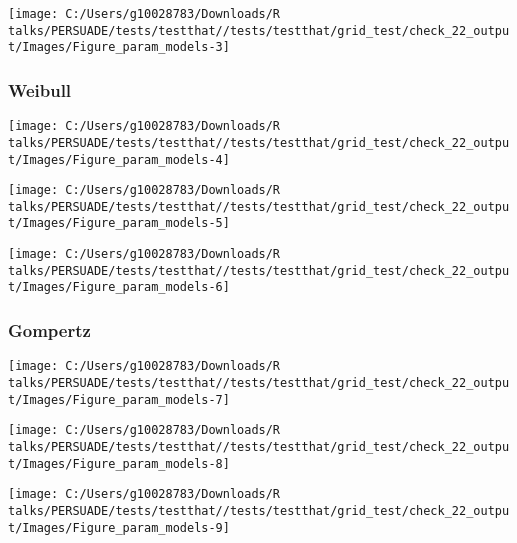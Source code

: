 \documentclass[
]{article}
\begin{document}
\begin{flushleft}\texttt{[image: C:/Users/g10028783/Downloads/R talks/PERSUADE/tests/testthat//tests/testthat/grid\_test/check\_22\_output/Images/Figure\_param\_models-3]} \end{flushleft}

\clearpage

\subsubsection{Weibull}\label{weibull}

\begin{flushleft}\texttt{[image: C:/Users/g10028783/Downloads/R talks/PERSUADE/tests/testthat//tests/testthat/grid\_test/check\_22\_output/Images/Figure\_param\_models-4]} \end{flushleft}

\begin{flushleft}\texttt{[image: C:/Users/g10028783/Downloads/R talks/PERSUADE/tests/testthat//tests/testthat/grid\_test/check\_22\_output/Images/Figure\_param\_models-5]} \end{flushleft}

\begin{flushleft}\texttt{[image: C:/Users/g10028783/Downloads/R talks/PERSUADE/tests/testthat//tests/testthat/grid\_test/check\_22\_output/Images/Figure\_param\_models-6]} \end{flushleft}

\clearpage

\subsubsection{Gompertz}\label{gompertz}

\begin{flushleft}\texttt{[image: C:/Users/g10028783/Downloads/R talks/PERSUADE/tests/testthat//tests/testthat/grid\_test/check\_22\_output/Images/Figure\_param\_models-7]} \end{flushleft}

\begin{flushleft}\texttt{[image: C:/Users/g10028783/Downloads/R talks/PERSUADE/tests/testthat//tests/testthat/grid\_test/check\_22\_output/Images/Figure\_param\_models-8]} \end{flushleft}

\begin{flushleft}\texttt{[image: C:/Users/g10028783/Downloads/R talks/PERSUADE/tests/testthat//tests/testthat/grid\_test/check\_22\_output/Images/Figure\_param\_models-9]} \end{flushleft}
\end{document}
